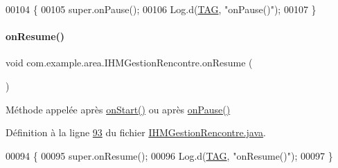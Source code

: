 \begin{DoxyCode}
00104     \{
00105         super.onPause();
00106         Log.d(\hyperlink{classcom_1_1example_1_1area_1_1_i_h_m_gestion_rencontre_a0ac4d9152d48619cd697c8c69166219f}{TAG}, \textcolor{stringliteral}{"onPause()"});
00107     \}
\end{DoxyCode}
\mbox{\label{classcom_1_1example_1_1area_1_1_i_h_m_gestion_rencontre_ad8a4a274c61458fe25a48ccba0d846e7}} 
\paragraph{\texorpdfstring{on\+Resume()}{onResume()}}
{\footnotesize\ttfamily void com.\+example.\+area.\+I\+H\+M\+Gestion\+Rencontre.\+on\+Resume (\begin{DoxyParamCaption}{ }\end{DoxyParamCaption})\hspace{0.3cm}{\ttfamily [protected]}}



Méthode appelée après \hyperlink{classcom_1_1example_1_1area_1_1_i_h_m_gestion_rencontre_ae34fc2516b20ce7917e53eb9e55c7afc}{on\+Start()} ou après \hyperlink{classcom_1_1example_1_1area_1_1_i_h_m_gestion_rencontre_a390adc8e9ec98d7147957ce8d9e1c071}{on\+Pause()} 



Définition à la ligne \hyperlink{_i_h_m_gestion_rencontre_8java_source_l00093}{93} du fichier \hyperlink{_i_h_m_gestion_rencontre_8java_source}{I\+H\+M\+Gestion\+Rencontre.\+java}.


\begin{DoxyCode}
00094     \{
00095         super.onResume();
00096         Log.d(\hyperlink{classcom_1_1example_1_1area_1_1_i_h_m_gestion_rencontre_a0ac4d9152d48619cd697c8c69166219f}{TAG}, \textcolor{stringliteral}{"onResume()"});
00097     \}
\end{DoxyCode}
\mbox{\label{classcom_1_1example_1_1area_1_1_i_h_m_gestion_rencontre_ae34fc2516b20ce7917e53eb9e55c7afc}} 
